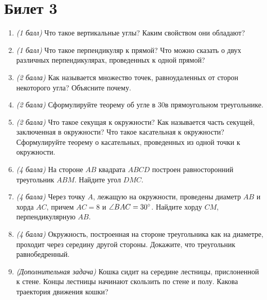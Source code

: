 \documentclass[12pt, a4paper]{article}
\begin{document}
\section*{Билет 3}
\begin{enumerate}
\item \textit{(1 балл)} Что такое вертикальные углы? Каким свойством они обладают?
\item \textit{(1 балл)} Что такое перпендикуляр к прямой? Что можно сказать о двух различных перпендикулярах, проведенных к одной прямой?
\item \textit{(2 балла)} Как называется множество точек, равноудаленных от сторон некоторого угла? Объясните почему.
\item \textit{(2 балла)} Сформулируйте теорему об угле в 30\degree в прямоугольном треугольнике.
\item \textit{(2 балла)} Что такое секущая к окружности? Как называется часть секущей, заключенная в окружности? Что такое касательная к окружности? Сформулируйте теорему о касательных, проведенных из одной точки к окружности.
\item \textit{(4 балла)} На стороне $AB$ квадрата $ABCD$ построен равносторонний треугольник $ABM$. Найдите угол $DMC$.
\item \textit{(4 балла)} Через точку $A$, лежащую на окружности, проведены диаметр $AB$ и хорда $AC$, причем $AC = 8$ и $\angle BAC = 30\degree$. Найдите хорду $CM$, перпендикулярную $AB$.
\item \textit{(4 балла)} Окружность, построенная на стороне треугольника как на диаметре, проходит через середину другой стороны. Докажите, что треугольник равнобедренный.
\item \textit{(Дополнительная задача)} Кошка сидит на середине лестницы, прислоненной к стене. Концы лестницы начинают скользить по стене и полу. Какова траектория движения кошки?
\end{enumerate}
\end{document}
